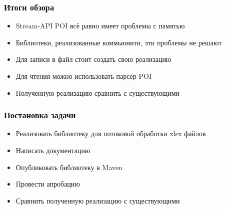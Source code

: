 \documentclass{beamer}
\begin{document}
\begin{frame}\frametitle{Итоги обзора}
\begin{itemize}
    \item Stream-API POI всё равно имеет проблемы с памятью
    \item Библиотеки, реализованные коммьюнити, эти проблемы не решают
    \item Для записи в файл стоит создать свою реализацию
    \item Для чтения можно использовать парсер POI
    \item Полученную реализацию сравнить с существующими
\end{itemize}
\end{frame}

\begin{frame}\frametitle{Постановка задачи}
\begin{itemize}
    \item Реализовать библиотеку для потоковой обработки xlsx файлов
    \item Написать документацию
    \item Опубликовать библиотеку в Maven
    \item Провести апробацию
    \item Сравнить полученную реализацию с существующими
\end{itemize}
\end{frame}

\end{document}
